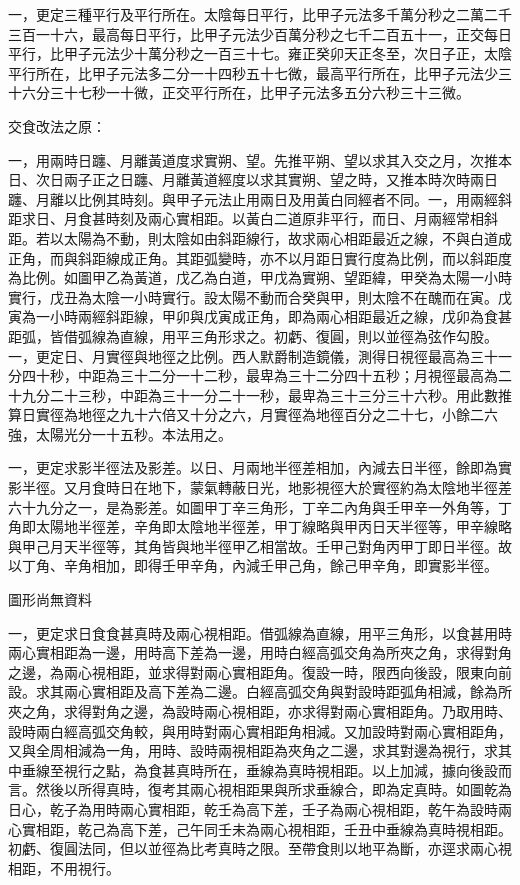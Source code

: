 \begin{pinyinscope}
一，更定三種平行及平行所在。太陰每日平行，比甲子元法多千萬分秒之二萬二千三百一十六，最高每日平行，比甲子元法少百萬分秒之七千二百五十一，正交每日平行，比甲子元法少十萬分秒之一百三十七。雍正癸卯天正冬至，次日子正，太陰平行所在，比甲子元法多二分一十四秒五十七微，最高平行所在，比甲子元法少三十六分三十七秒一十微，正交平行所在，比甲子元法多五分六秒三十三微。

交食改法之原：

一，用兩時日躔、月離黃道度求實朔、望。先推平朔、望以求其入交之月，次推本日、次日兩子正之日躔、月離黃道經度以求其實朔、望之時，又推本時次時兩日躔、月離以比例其時刻。與甲子元法止用兩日及用黃白同經者不同。一，用兩經斜距求日、月食甚時刻及兩心實相距。以黃白二道原非平行，而日、月兩經常相斜距。若以太陽為不動，則太陰如由斜距線行，故求兩心相距最近之線，不與白道成正角，而與斜距線成正角。其距弧變時，亦不以月距日實行度為比例，而以斜距度為比例。如圖甲乙為黃道，戊乙為白道，甲戊為實朔、望距緯，甲癸為太陽一小時實行，戊丑為太陰一小時實行。設太陽不動而合癸與甲，則太陰不在醜而在寅。戊寅為一小時兩經斜距線，甲卯與戊寅成正角，即為兩心相距最近之線，戊卯為食甚距弧，皆借弧線為直線，用平三角形求之。初虧、復圓，則以並徑為弦作勾股。一，更定日、月實徑與地徑之比例。西人默爵制造鏡儀，測得日視徑最高為三十一分四十秒，中距為三十二分一十二秒，最卑為三十二分四十五秒；月視徑最高為二十九分二十三秒，中距為三十一分二十一秒，最卑為三十三分三十六秒。用此數推算日實徑為地徑之九十六倍又十分之六，月實徑為地徑百分之二十七，小餘二六強，太陽光分一十五秒。本法用之。

一，更定求影半徑法及影差。以日、月兩地半徑差相加，內減去日半徑，餘即為實影半徑。又月食時日在地下，蒙氣轉蔽日光，地影視徑大於實徑約為太陰地半徑差六十九分之一，是為影差。如圖甲丁辛三角形，丁辛二內角與壬甲辛一外角等，丁角即太陽地半徑差，辛角即太陰地半徑差，甲丁線略與甲丙日天半徑等，甲辛線略與甲己月天半徑等，其角皆與地半徑甲乙相當故。壬甲己對角丙甲丁即日半徑。故以丁角、辛角相加，即得壬甲辛角，內減壬甲己角，餘己甲辛角，即實影半徑。

圖形尚無資料

一，更定求日食食甚真時及兩心視相距。借弧線為直線，用平三角形，以食甚用時兩心實相距為一邊，用時高下差為一邊，用時白經高弧交角為所夾之角，求得對角之邊，為兩心視相距，並求得對兩心實相距角。復設一時，限西向後設，限東向前設。求其兩心實相距及高下差為二邊。白經高弧交角與對設時距弧角相減，餘為所夾之角，求得對角之邊，為設時兩心視相距，亦求得對兩心實相距角。乃取用時、設時兩白經高弧交角較，與用時對兩心實相距角相減。又加設時對兩心實相距角，又與全周相減為一角，用時、設時兩視相距為夾角之二邊，求其對邊為視行，求其中垂線至視行之點，為食甚真時所在，垂線為真時視相距。以上加減，據向後設而言。然後以所得真時，復考其兩心視相距果與所求垂線合，即為定真時。如圖乾為日心，乾子為用時兩心實相距，乾壬為高下差，壬子為兩心視相距，乾午為設時兩心實相距，乾己為高下差，己午同壬未為兩心視相距，壬丑中垂線為真時視相距。初虧、復圓法同，但以並徑為比考真時之限。至帶食則以地平為斷，亦逕求兩心視相距，不用視行。


\end{pinyinscope}
